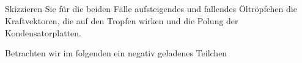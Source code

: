 \subsection{}

\begin{tcolorbox}[voraufgabe]
Skizzieren Sie für die beiden Fälle aufsteigendes und fallendes Öltröpfchen die Kraftvektoren, die auf den Tropfen wirken und die Polung der Kondensatorplatten.
\end{tcolorbox}

Betrachten wir im folgenden ein negativ geladenes Teilchen
